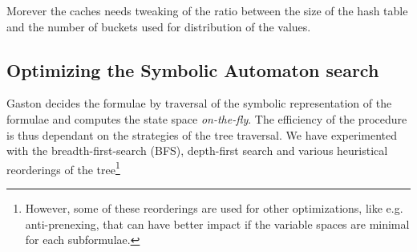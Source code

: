   Morever the caches needs tweaking of the ratio between the
  size of the hash table and the number of buckets used for
  distribution of the values.

  \subsection{Optimizing the Symbolic Automaton search}
  
  Gaston decides the formulae by traversal of the symbolic
  representation of the formulae and computes the state space
  \emph{on-the-fly}. The efficiency of the procedure is thus
  dependant on the strategies of the tree traversal. We have
  experimented with the breadth-first-search (BFS), depth-first
  search and various heuristical reorderings of the tree\footnote{However,
  some of these reorderings are used for other optimizations, like
  e.g. anti-prenexing, that can have better impact if the
  variable spaces are minimal for each subformulae.}

